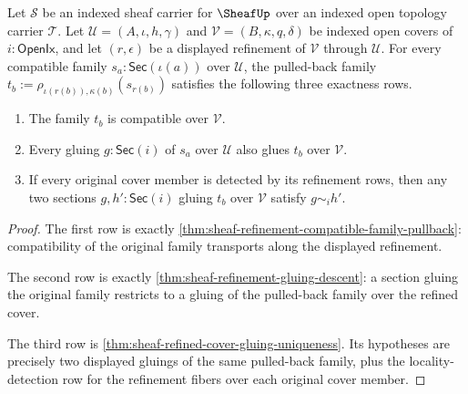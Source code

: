 \begin{theorem}
\label{thm:sheaf-refined-cover-exactness-obligation}
Let $\mathcal{S}$ be an indexed sheaf carrier for $\SheafUp$ over an indexed open topology carrier $\mathcal{T}$. Let $\mathcal{U}=(A,\iota,h,\gamma)$ and $\mathcal{V}=(B,\kappa,q,\delta)$ be indexed open covers of $i:\mathsf{OpenIx}$, and let $(r,\epsilon)$ be a displayed refinement of $\mathcal{V}$ through $\mathcal{U}$. For every compatible family $s_a:\mathsf{Sec}(\iota(a))$ over $\mathcal{U}$, the pulled-back family $t_b:=\rho_{\iota(r(b)),\kappa(b)}(s_{r(b)})$ satisfies the following three exactness rows.
\begin{enumerate}
\item The family $t_b$ is compatible over $\mathcal{V}$.
\item Every gluing $g:\mathsf{Sec}(i)$ of $s_a$ over $\mathcal{U}$ also glues $t_b$ over $\mathcal{V}$.
\item If every original cover member is detected by its refinement rows, then any two sections $g,h':\mathsf{Sec}(i)$ gluing $t_b$ over $\mathcal{V}$ satisfy $g\sim_i h'$.
\end{enumerate}
\end{theorem}
\begin{proof}
The first row is exactly \autoref{thm:sheaf-refinement-compatible-family-pullback}: compatibility of the original family transports along the displayed refinement.

The second row is exactly \autoref{thm:sheaf-refinement-gluing-descent}: a section gluing the original family restricts to a gluing of the pulled-back family over the refined cover.

The third row is \autoref{thm:sheaf-refined-cover-gluing-uniqueness}. Its hypotheses are precisely two displayed gluings of the same pulled-back family, plus the locality-detection row for the refinement fibers over each original cover member.
\end{proof}

